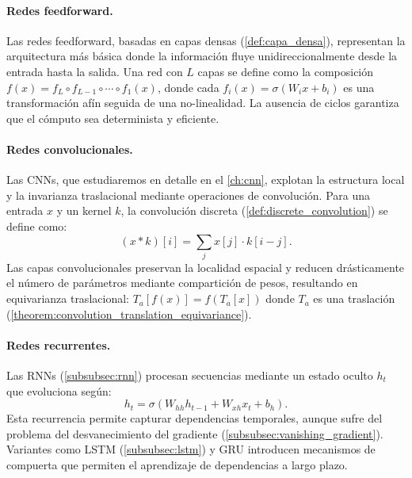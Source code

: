 \paragraph{Redes feedforward.}
Las redes feedforward, basadas en capas densas (\autoref{def:capa_densa}), representan la arquitectura más básica donde la información fluye unidireccionalmente desde la entrada hasta la salida. Una red con $L$ capas se define como la composición $f(x) = f_L \circ f_{L-1} \circ \cdots \circ f_1(x)$, donde cada $f_i(x) = \sigma(W_i x + b_i)$ es una transformación afín seguida de una no-linealidad. La ausencia de ciclos garantiza que el cómputo sea determinista y eficiente.

\paragraph{Redes convolucionales.}
Las \glspl{CNN}, que estudiaremos en detalle en el \autoref{ch:cnn}, explotan la estructura local y la invarianza traslacional mediante operaciones de convolución. Para una entrada $x$ y un kernel $k$, la convolución discreta (\autoref{def:discrete_convolution}) se define como:
\[
	(x * k)[i] = \sum_j x[j] \cdot k[i-j].
\]
Las capas convolucionales preservan la localidad espacial y reducen drásticamente el número de parámetros mediante compartición de pesos, resultando en equivarianza traslacional: $T_a[f(x)] = f(T_a[x])$ donde $T_a$ es una traslación (\autoref{theorem:convolution_translation_equivariance}).

\paragraph{Redes recurrentes.}
Las \glspl{RNN} (\autoref{subsubsec:rnn}) procesan secuencias mediante un estado oculto $h_t$ que evoluciona según:
\[
	h_t = \sigma(W_{hh} h_{t-1} + W_{xh} x_t + b_h).
\]
Esta recurrencia permite capturar dependencias temporales, aunque sufre del problema del desvanecimiento del gradiente (\autoref{subsubsec:vanishing_gradient}). Variantes como \gls{LSTM} (\autoref{subsubsec:lstm}) y \gls{GRU} introducen mecanismos de compuerta que permiten el aprendizaje de dependencias a largo plazo.

